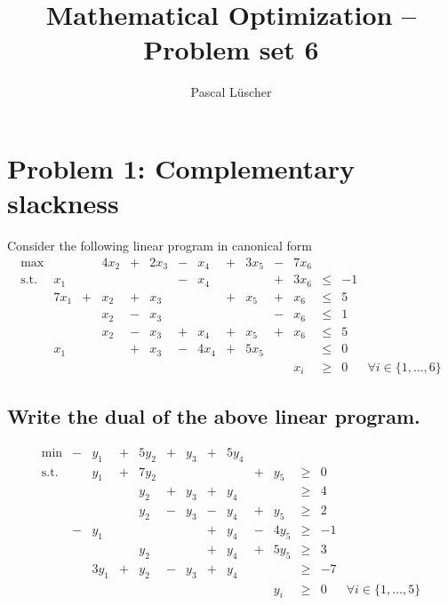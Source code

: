 \documentclass[12pt, a4]{article}
\author{Pascal Lüscher}
\title{Mathematical Optimization – Problem set 6}
\begin{document}
	\section{Problem 1: Complementary slackness}
	Consider the following linear program in canonical form
	\begin{equation}\label{eq:prob1_canonical}
		\begin{array}{lrcrcrcrcrcrcrr}
			\text{max}  &      &   & 4x_2 & + & 2x_3 & - &  x_4 & + & 3x_5 & - & 7x_6 \\
			\text{s.t.} &  x_1 &   &      &   &      & - &  x_4 &   &      & + & 3x_6 & \leq & -1 \\
						& 7x_1 & + &  x_2 & + &  x_3 &   &      & + &  x_5 & + &  x_6 & \leq &  5 \\
			  			&      &   &  x_2 & - &  x_3 &   &      &   &      & - &  x_6 & \leq &  1 \\
						&      &   &  x_2 & - &  x_3 & + &  x_4 & + &  x_5 & + &  x_6 & \leq &  5 \\
			 			&  x_1 &   &      & + &  x_3 & - & 4x_4 & + & 5x_5 &   &      & \leq &  0 \\
			            &      &   &      &   &      &   &      &   &      &   &  x_i & \geq & 0 & \forall i \in \{1,\ldots,6\}
		\end{array}
	\end{equation}
\subsection{Write the dual of the above linear program.}
	 \begin{equation}\label{eq:prob1_dual}
 		\begin{array}{lcrcrcrcrcrcrr}
 			\text{min}  & - &  y_1 & + & 5y_2 & + &  y_3 & + & 5y_4 &  &  \\
 			\text{s.t.} &   &  y_1 & + & 7y_2 &   &      &   &      & + &  y_5 & \geq &  0\\
 					 	&   &      &   &  y_2 & + &  y_3 & + &  y_4 &   &      & \geq &  4\\
 					 	&   &      &   &  y_2 & - &  y_3 & - &  y_4 & + &  y_5 & \geq &  2\\
 					 	& - &  y_1 &   &      &   &      & + &  y_4 & - & 4y_5 & \geq & -1\\
 					 	&   &      &   &  y_2 &   &      & + &  y_4 & + & 5y_5 & \geq &  3\\
 					 	&   & 3y_1 & + &  y_2 & - &  y_3 & + &  y_4 &   &      & \geq & -7\\
 					 	&   &      &   &      &   &      &   &      &   &  y_i & \geq & 0 & \forall i \in \{1,\ldots,5\}\\
 		\end{array}
 	\end{equation}
 
\end{document}
